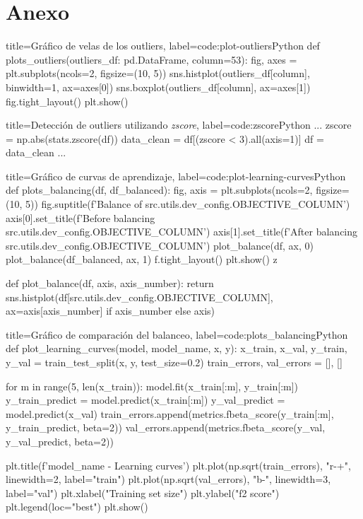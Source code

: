 \section{Anexo}\label{sec:anex}

\begin{code}[numbers=left]{title=Gráfico de velas de los outliers, label=code:plot-outliers}{Python}
def plots_outliers(outliers_df: pd.DataFrame, column=53):
    fig, axes = plt.subplots(ncols=2, figsize=(10, 5))
    sns.histplot(outliers_df[column], binwidth=1, ax=axes[0])
    sns.boxplot(outliers_df[column], ax=axes[1])
    fig.tight_layout()
    plt.show()
\end{code}

\begin{code}[numbers=left]{title=Detección de outliers utilizando \textit{zscore}, label=code:zscore}{Python}
...
    zscore = np.abs(stats.zscore(df))
    data_clean = df[(zscore < 3).all(axis=1)]
    df = data_clean
...
\end{code}

\begin{code}[numbers=left]{title=Gráfico de curvas de aprendizaje, label=code:plot-learning-curves}{Python}
def plots_balancing(df, df_balanced):
    fig, axis = plt.subplots(ncols=2, figsize=(10, 5))
    fig.suptitle(f'Balance of {src.utils.dev_config.OBJECTIVE_COLUMN}')
    axis[0].set_title(f'Before balancing {src.utils.dev_config.OBJECTIVE_COLUMN}')
    axis[1].set_title(f'After balancing {src.utils.dev_config.OBJECTIVE_COLUMN}')
    plot_balance(df, ax, 0)
    plot_balance(df_balanced, ax, 1)
    f.tight_layout()
    plt.show()
z

def plot_balance(df, axis, axis_number):
    return sns.histplot(df[src.utils.dev_config.OBJECTIVE_COLUMN], ax=axis[axis_number] if axis_number else axis)
\end{code}

\begin{code}[numbers=left]{title=Gráfico de comparación del balanceo, label=code:plots_balancing}{Python}
def plot_learning_curves(model, model_name, x, y):
    x_train, x_val, y_train, y_val = train_test_split(x, y, test_size=0.2)
    train_errors, val_errors = [], []
    
    for m in range(5, len(x_train)):
        model.fit(x_train[:m], y_train[:m])
        y_train_predict = model.predict(x_train[:m])
        y_val_predict = model.predict(x_val)
        train_errors.append(metrics.fbeta_score(y_train[:m], y_train_predict, beta=2))
        val_errors.append(metrics.fbeta_score(y_val, y_val_predict, beta=2))
        
    plt.title(f'{model_name} - Learning curves')
    plt.plot(np.sqrt(train_errors), "r-+", linewidth=2, label="train")
    plt.plot(np.sqrt(val_errors), "b-", linewidth=3, label="val")
    plt.xlabel("Training set size")
    plt.ylabel("f2 score")
    plt.legend(loc="best")
    plt.show()
\end{code}

